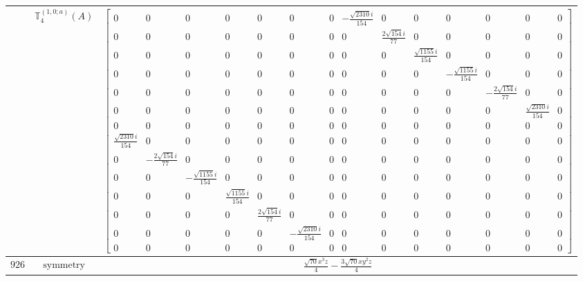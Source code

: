 \documentclass[fleqn,8pt,landscape]{jsarticle}
\begin{document}
\begin{longtable}{ccc}
$  $ & $ \mathbb{T}_{4}^{(1,0;a)}(A) $ & $ \begin{bmatrix} 0 & 0 & 0 & 0 & 0 & 0 & 0 & - \frac{\sqrt{2310} i}{154} & 0 & 0 & 0 & 0 & 0 & 0 \\ 0 & 0 & 0 & 0 & 0 & 0 & 0 & 0 & \frac{2 \sqrt{154} i}{77} & 0 & 0 & 0 & 0 & 0 \\ 0 & 0 & 0 & 0 & 0 & 0 & 0 & 0 & 0 & \frac{\sqrt{1155} i}{154} & 0 & 0 & 0 & 0 \\ 0 & 0 & 0 & 0 & 0 & 0 & 0 & 0 & 0 & 0 & - \frac{\sqrt{1155} i}{154} & 0 & 0 & 0 \\ 0 & 0 & 0 & 0 & 0 & 0 & 0 & 0 & 0 & 0 & 0 & - \frac{2 \sqrt{154} i}{77} & 0 & 0 \\ 0 & 0 & 0 & 0 & 0 & 0 & 0 & 0 & 0 & 0 & 0 & 0 & \frac{\sqrt{2310} i}{154} & 0 \\ 0 & 0 & 0 & 0 & 0 & 0 & 0 & 0 & 0 & 0 & 0 & 0 & 0 & 0 \\ \frac{\sqrt{2310} i}{154} & 0 & 0 & 0 & 0 & 0 & 0 & 0 & 0 & 0 & 0 & 0 & 0 & 0 \\ 0 & - \frac{2 \sqrt{154} i}{77} & 0 & 0 & 0 & 0 & 0 & 0 & 0 & 0 & 0 & 0 & 0 & 0 \\ 0 & 0 & - \frac{\sqrt{1155} i}{154} & 0 & 0 & 0 & 0 & 0 & 0 & 0 & 0 & 0 & 0 & 0 \\ 0 & 0 & 0 & \frac{\sqrt{1155} i}{154} & 0 & 0 & 0 & 0 & 0 & 0 & 0 & 0 & 0 & 0 \\ 0 & 0 & 0 & 0 & \frac{2 \sqrt{154} i}{77} & 0 & 0 & 0 & 0 & 0 & 0 & 0 & 0 & 0 \\ 0 & 0 & 0 & 0 & 0 & - \frac{\sqrt{2310} i}{154} & 0 & 0 & 0 & 0 & 0 & 0 & 0 & 0 \\ 0 & 0 & 0 & 0 & 0 & 0 & 0 & 0 & 0 & 0 & 0 & 0 & 0 & 0 \end{bmatrix} $ \\ \hline
$ 926 $ & $ \text{symmetry} $ & $ \frac{\sqrt{70} x^{3} z}{4} - \frac{3 \sqrt{70} x y^{2} z}{4} $ \\

\end{longtable}
\end{document}
